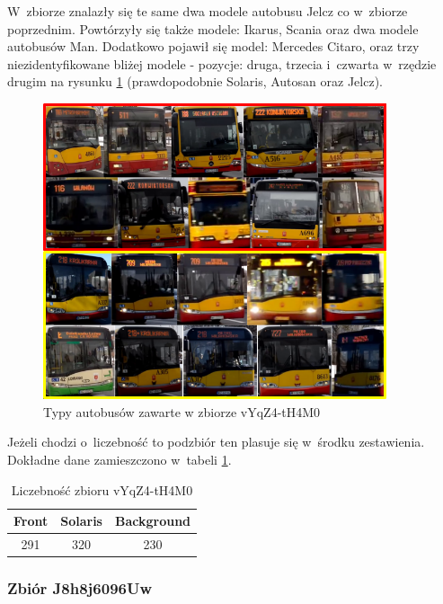 W~zbiorze znalazły się te same dwa modele autobusu Jelcz co w~zbiorze
poprzednim. Powtórzyły się także modele: Ikarus, Scania oraz dwa modele
autobusów Man. Dodatkowo pojawił się model: Mercedes Citaro, oraz trzy 
niezidentyfikowane bliżej modele - pozycje: druga, trzecia i~czwarta 
w~rzędzie drugim na rysunku \ref{fig:vYqZ4-tH4M0_types} 
(prawdopodobnie Solaris, Autosan oraz Jelcz).

\begin{figure}[!h]
    \centering
    \includegraphics[width=0.9\textwidth]{img/exp_trainig_data_vYq}
    \caption{Typy autobusów zawarte w zbiorze vYqZ4-tH4M0}
    \label{fig:vYqZ4-tH4M0_types}
\end{figure}

Jeżeli chodzi o~liczebność to podzbiór ten plasuje się w~środku 
zestawienia.
Dokładne dane zamieszczono w~tabeli \ref{tab:vYqZ4-tH4M0_count}.

\begin{table}[!h]
    \centering
    \begin{tabular}{c|c|c}
        Front   & Solaris   & Background \\ \hline
        291     & 320       & 230 
    \end{tabular}
    \caption{Liczebność zbioru vYqZ4-tH4M0}
    \label{tab:vYqZ4-tH4M0_count}
\end{table}

\newpage

\subsubsection{Zbiór J8h8j6096Uw}

